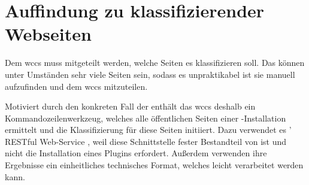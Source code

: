 \section{Auffindung zu klassifizierender Webseiten}
    Dem \gls{wccs} muss mitgeteilt werden, welche Seiten es klassifizieren soll.
    Das können unter Umständen sehr viele Seiten sein,
    sodass es unpraktikabel ist sie manuell aufzufinden
    und dem \gls{wccs} mitzuteilen.

    Motiviert durch den konkreten Fall der {\fernUni} enthält das \gls{wccs}
    deshalb ein Kommandozeilenwerkzeug, welches alle öffentlichen Seiten einer
    {\wordpress}-Installation ermittelt und die Klassifizierung für diese Seiten initiiert.
    Dazu verwendet es {\wordpress}' RESTful Web-Service \cite{wordpress:RestAPI},
    weil diese Schnittstelle fester Bestandteil von {\wordpress} ist und nicht die
    Installation eines Plugins erfordert.
    Außerdem verwenden ihre Ergebnisse ein einheitliches technisches Format,
    welches leicht verarbeitet werden kann.
